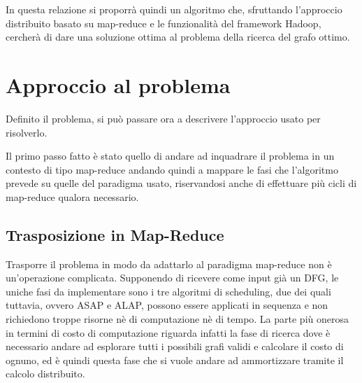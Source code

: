 \documentclass[]{IEEEtran}
\begin{document}
In questa relazione si proporrà quindi un algoritmo che, sfruttando l'approccio distribuito basato su map-reduce e le funzionalità del framework Hadoop, cercherà di dare una soluzione ottima al problema della ricerca del grafo ottimo.
\section{Approccio al problema}
Definito il problema, si può passare ora a descrivere l'approccio usato per risolverlo.

Il primo passo fatto è stato quello di andare ad inquadrare il problema in un contesto di tipo map-reduce andando quindi a mappare le fasi che l'algoritmo prevede su quelle del paradigma usato, riservandosi anche di effettuare più cicli di map-reduce qualora necessario.
\subsection{Trasposizione in Map-Reduce}
Trasporre il problema in modo da adattarlo al paradigma map-reduce non è un'operazione complicata. Supponendo di ricevere come input già un DFG, le uniche fasi da implementare sono i tre algoritmi di scheduling, due dei quali tuttavia, ovvero ASAP e ALAP, possono essere applicati in sequenza e non richiedono troppe risorne nè di computazione nè di tempo. La parte più onerosa in termini di costo di computazione riguarda infatti la fase di ricerca dove è necessario andare ad esplorare tutti i possibili grafi validi e calcolare il costo di ognuno, ed è quindi questa fase che si vuole andare ad ammortizzare tramite il calcolo distribuito. 
\end{document}
